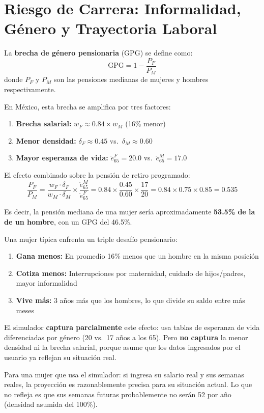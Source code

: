 \documentclass[11pt,a4paper]{report}
\begin{document}
\section{Riesgo de Carrera: Informalidad, G\'enero y Trayectoria Laboral}

\begin{tcolorbox}[colback=blue!5!white, colframe=blue!75!black, title=\textbf{Definici\'on Formal: Brecha de G\'enero en Pensiones}]
La \textbf{brecha de g\'enero pensionaria} ($\text{GPG}$) se define como:
\[
  \text{GPG} = 1 - \frac{P_F}{P_M}
\]
donde $P_F$ y $P_M$ son las pensiones medianas de mujeres y hombres respectivamente.

En M\'exico, esta brecha se amplifica por tres factores:
\begin{enumerate}
  \item \textbf{Brecha salarial:} $w_F \approx 0.84 \times w_M$ (16\% menor)
  \item \textbf{Menor densidad:} $\delta_F \approx 0.45$ vs.\ $\delta_M \approx 0.60$
  \item \textbf{Mayor esperanza de vida:} $\mathring{e}_{65}^F = 20.0$ vs.\ $\mathring{e}_{65}^M = 17.0$
\end{enumerate}

El efecto combinado sobre la pensi\'on de retiro programado:
\[
  \frac{P_F}{P_M} = \frac{w_F \cdot \delta_F}{w_M \cdot \delta_M} \times \frac{\mathring{e}_{65}^M}{\mathring{e}_{65}^F} = 0.84 \times \frac{0.45}{0.60} \times \frac{17}{20} = 0.84 \times 0.75 \times 0.85 = 0.535
\]

Es decir, la pensi\'on mediana de una mujer ser\'ia aproximadamente \textbf{53.5\% de la de un hombre}, con un GPG del 46.5\%.
\end{tcolorbox}

\begin{tcolorbox}[colback=green!5!white, colframe=green!50!black, title=\textbf{Intuici\'on: Las Mujeres Necesitan Ahorrar M\'as para la Misma Pensi\'on}]
Una mujer t\'ipica enfrenta un triple desaf\'io pensionario:
\begin{enumerate}
  \item \textbf{Gana menos:} En promedio 16\% menos que un hombre en la misma posici\'on
  \item \textbf{Cotiza menos:} Interrupciones por maternidad, cuidado de hijos/padres, mayor informalidad
  \item \textbf{Vive m\'as:} 3 a\~nos m\'as que los hombres, lo que divide su saldo entre m\'as meses
\end{enumerate}

El simulador \textbf{captura parcialmente} este efecto: usa tablas de esperanza de vida diferenciadas por g\'enero (20 vs.\ 17 a\~nos a los 65). Pero \textbf{no captura} la menor densidad ni la brecha salarial, porque asume que los datos ingresados por el usuario ya reflejan su situaci\'on real.

Para una mujer que usa el simulador: si ingresa su salario real y sus semanas reales, la proyecci\'on es razonablemente precisa para su situaci\'on actual. Lo que no refleja es que sus semanas futuras probablemente no ser\'an 52 por a\~no (densidad asumida del 100\%).
\end{tcolorbox}
\end{document}
